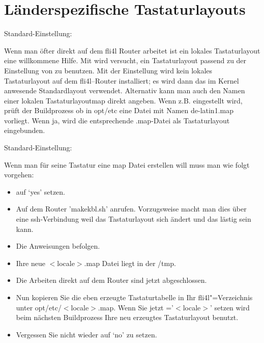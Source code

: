 \section{Länderspezifische Tastaturlayouts}

\begin{description}


  Standard-Einstellung: 
  
  Wenn man öfter direkt auf dem fli4l Router arbeitet ist ein lokales
  Tastaturlayout eine willkommene Hilfe. Mit
   wird versucht, ein Tastaturlayout passend zu
  der Einstellung von  zu benutzen. Mit der
  Einstellung  wird kein lokales Tastaturlayout auf dem
  fli4l--Router installiert; es wird dann das im Kernel anwesende
  Standardlayout verwendet. Alternativ kann man auch den Namen einer
  lokalen Tastaturlayoutmap direkt angeben. Wenn z.B. 
  eingestellt wird, prüft der Buildprozess ob in opt/etc eine Datei mit
  Namen de-latin1.map vorliegt. Wenn ja, wird die entsprechende .map-Datei
  als Tastaturlayout eingebunden.

  
  Standard-Einstellung: 
  
  Wenn man für seine Tastatur eine map Datei erstellen will muss man
  wie folgt vorgehen:

  \begin{itemize}
    \item {} auf `yes' setzen.
    \item Auf dem Router 'makekbl.sh' anrufen. Vorzugsweise macht man dies über
      eine ssh-Verbindung weil das Tastaturlayout sich ändert und das lästig sein
      kann.
    \item Die Anweisungen befolgen.
    \item Ihre neue $<$locale$>$.map Datei liegt in der /tmp.
    \item Die Arbeiten direkt auf dem Router sind jetzt abgeschlossen.
    \item Nun kopieren Sie die eben erzeugte Tastaturtabelle in Ihr fli4l"=Verzeichnis unter 
      opt/etc/$<$locale$>$.map. Wenn Sie jetzt ='$<$locale$>$' setzen 
      wird beim nächsten Buildprozess Ihre neu erzeugtes Tastaturlayout benutzt.
    \item Vergessen Sie nicht  wieder auf `no' zu setzen.
  \end{itemize}
\end{description}